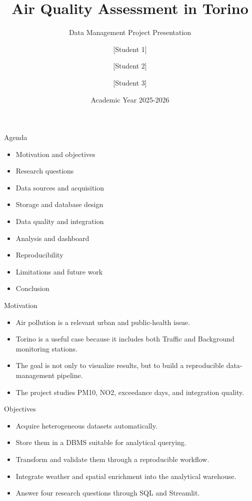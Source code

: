 \documentclass[aspectratio=169]{beamer}
\title{Air Quality Assessment in Torino}
\subtitle{Data Management Project Presentation}
\author{[Student 1] \and [Student 2] \and [Student 3]}
\institute{Universita degli Studi di Milano-Bicocca (UNIMIB)}
\date{Academic Year 2025-2026\\[insert presentation date]}
\begin{document}
\begin{frame}
  \titlepage
\end{frame}

\begin{frame}{Agenda}
\begin{itemize}
  \item Motivation and objectives
  \item Research questions
  \item Data sources and acquisition
  \item Storage and database design
  \item Data quality and integration
  \item Analysis and dashboard
  \item Reproducibility
  \item Limitations and future work
  \item Conclusion
\end{itemize}
\end{frame}

\begin{frame}{Motivation}
\begin{itemize}
  \item Air pollution is a relevant urban and public-health issue.
  \item Torino is a useful case because it includes both Traffic and Background monitoring stations.
  \item The goal is not only to visualize results, but to build a reproducible data-management pipeline.
  \item The project studies PM10, NO2, exceedance days, and integration quality.
\end{itemize}
\end{frame}

\begin{frame}{Objectives}
\begin{itemize}
  \item Acquire heterogeneous datasets automatically.
  \item Store them in a DBMS suitable for analytical querying.
  \item Transform and validate them through a reproducible workflow.
  \item Integrate weather and spatial enrichment into the analytical warehouse.
  \item Answer four research questions through SQL and Streamlit.
\end{itemize}
\end{frame}
\end{document}
